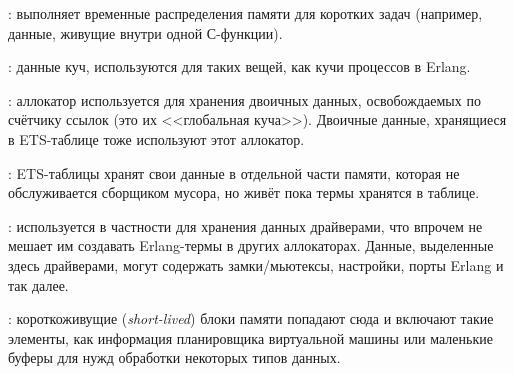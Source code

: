\documentclass[11pt, oneside]{book}   	%
\begin{document}
\begin{enumerate*}
	\item {}: выполняет временные распределения памяти для коротких задач (например, данные, живущие внутри одной С-функции).
	\item {}: данные куч, используются для таких вещей, как кучи процессов в Erlang.
	\item {}: аллокатор используется для хранения двоичных данных, освобождаемых по счётчику ссылок (это их <<глобальная куча>>). Двоичные данные, хранящиеся в ETS-таблице тоже используют этот аллокатор.
	\item {}: ETS-таблицы хранят свои данные в отдельной части памяти, которая не обслуживается сборщиком мусора, но живёт пока термы хранятся в таблице.
	\item {}: используется в частности для хранения данных драйверами, что впрочем не мешает им создавать Erlang-термы в других аллокаторах. Данные, выделенные здесь драйверами, могут содержать замки/мьютексы, настройки, порты Erlang и так далее.
	\item {}: короткоживущие (\emph{short-lived}) блоки памяти попадают сюда и включают такие элементы, как информация планировщика виртуальной машины или маленькие буферы для нужд обработки некоторых типов данных.

\end{enumerate*}
\end{document}
